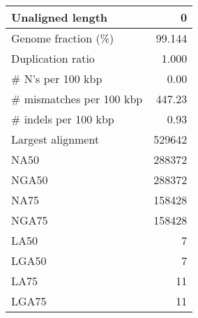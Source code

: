 \documentclass[12pt,a4paper]{article}
\begin{document}
\begin{table}[ht]
\begin{center}
\begin{tabular}{|l*{1}{|r}|}
Unaligned length & 0 \\ \hline
Genome fraction (\%) & 99.144 \\ \hline
Duplication ratio & 1.000 \\ \hline
\# N's per 100 kbp & 0.00 \\ \hline
\# mismatches per 100 kbp & 447.23 \\ \hline
\# indels per 100 kbp & 0.93 \\ \hline
Largest alignment & 529642 \\ \hline
NA50 & 288372 \\ \hline
NGA50 & 288372 \\ \hline
NA75 & 158428 \\ \hline
NGA75 & 158428 \\ \hline
LA50 & 7 \\ \hline
LGA50 & 7 \\ \hline
LA75 & 11 \\ \hline
LGA75 & 11 \\ \hline
\end{tabular}
\end{center}
\end{table}
\end{document}
